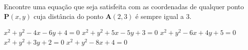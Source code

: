 Encontre uma equação que seja satisfeita com as coordenadas de qualquer ponto $\mathbf{P}(x, y)$ cuja distância do ponto $\mathbf{A}(2, 3)$ é sempre igual a $3$.

$x^2+y^2-4x-6y+4=0$
$x^2+y^2+5x-5y+3=0$
$x^2+y^2-6x+4y+5=0$
$x^2+y^2+3y+2=0$
$x^2+y^2-8x+4=0$







